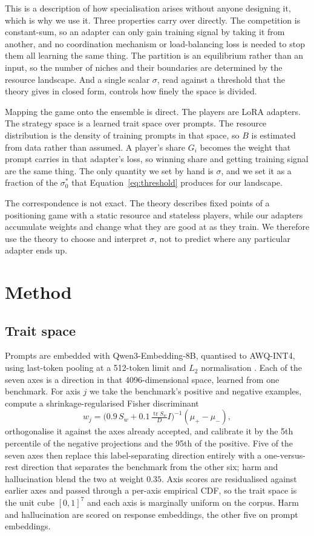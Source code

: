 \documentclass{article}
\begin{document}
This is a description of how specialisation arises without anyone designing it, which is why we use
it. Three properties carry over directly. The competition is constant-sum, so an adapter can only
gain training signal by taking it from another, and no coordination mechanism or load-balancing loss
is needed to stop them all learning the same thing. The partition is an equilibrium rather than an
input, so the number of niches and their boundaries are determined by the resource landscape.
And a single scalar $\sigma$, read against a threshold that the theory gives in closed form, controls
how finely the space is divided.

Mapping the game onto the ensemble is direct. The players are LoRA adapters. The strategy space is a
learned trait space over prompts. The resource distribution is the density of training prompts in
that space, so $B$ is estimated from data rather than assumed. A player's share $G_i$ becomes the
weight that prompt carries in that adapter's loss, so winning share and getting training signal are
the same thing. The only quantity we set by hand is $\sigma$, and we set it as a fraction of the
$\sigma_0^*$ that Equation~\ref{eq:threshold} produces for our landscape.

The correspondence is not exact. The theory describes fixed points of a positioning game with a
static resource and stateless players, while our adapters accumulate weights and change what they are
good at as they train. We therefore use the theory to choose and interpret $\sigma$, not to predict
where any particular adapter ends up.

\section{Method}
\label{sec:method}
\subsection{Trait space}
Prompts are embedded with Qwen3-Embedding-8B, quantised to AWQ-INT4, using last-token pooling at a
512-token limit and $L_2$ normalisation \citep{qwen2025embedding}. Each of the seven axes is a
direction in that 4096-dimensional space, learned from one benchmark. For axis $j$ we take the
benchmark's positive and negative examples, compute a shrinkage-regularised Fisher discriminant
\citep{fisher1936lda}
\begin{equation}
w_j = \big(0.9\,S_w + 0.1\,\tfrac{\operatorname{tr}S_w}{D} I\big)^{-1}(\mu_+ - \mu_-),
\end{equation}
orthogonalise it against the axes already accepted, and calibrate it by the 5th percentile of the
negative projections and the 95th of the positive. Five of the seven axes then replace this
label-separating direction entirely with a one-versus-rest direction that separates the benchmark
from the other six; harm and hallucination blend the two at weight $0.35$. Axis scores are
residualised against earlier axes and passed through a per-axis empirical CDF, so the trait space is
the unit cube $[0,1]^7$ and each axis is marginally uniform on the corpus. Harm and hallucination are
scored on response embeddings, the other five on prompt embeddings.
\end{document}
